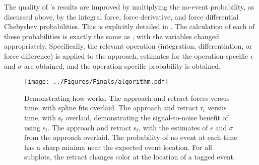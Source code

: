 The quality of \name{}'s results are improved by multiplying the no-event probability, as discussed above, by the integral force, force derivative, and force differential Chebyshev probabilities. This is explicitly detailed in . The calculation of each of these probabilities is exactly the same as , with the variables changed appropriately. Specifically, the relevant operation (integration, differentiation, or force difference) is applied to the approach, estimates for the operation-specific $\epsilon$ and $\sigma$ are obtained, and the operation-specific probability is obtained.


\begin{figure}[htp]
\caption[\name{} algorithmic pipeline]{\noindent{} Demonstrating how \name{} works.  The approach and retract forces versus time, with spline fits overlaid.  The approach and retract r$_t$ versus time, with s$_t$ overlaid, demonstrating the signal-to-noise benefit of using s$_t$.  The approach and retract s$_t$, with the estimates of $\epsilon$ and $\sigma$ from the approach overlaid.  The probability of no event at each time has a sharp minima near the expected event location. For all subplots, the retract changes color at the location of a tagged event.  }
\centering
\texttt{[image: ../Figures/Finals/algorithm.pdf]}%
\end{figure}

